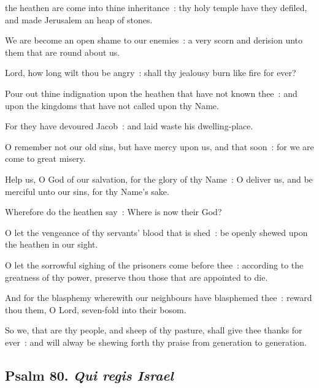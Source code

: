  the heathen are come into thine inheritance~: thy holy temple have they defiled, and made Jerusalem an heap of stones.\par
{}
We are become an open shame to our enemies~: a very scorn and derision unto them that are round about us.\par
{}Lord, how long wilt thou be angry~: shall thy jealousy burn like fire for ever?\par
{}Pour out thine indignation upon the heathen that have not known thee~: and upon the kingdoms that have not called upon thy Name.\par
{}For they have devoured Jacob~: and laid waste his dwelling-place.\par
{}O remember not our old sins, but have mercy upon us, and that soon~: for we are come to great misery.\par
{}Help us, O God of our salvation, for the glory of thy Name~: O deliver us, and be merciful unto our sins, for thy Name's sake.\par
{}Wherefore do the heathen say~: Where is now their God?\par
{}O let the vengeance of thy servants' blood that is shed~: be openly shewed upon the heathen in our sight.\par
{}O let the sorrowful sighing of the prisoners come before thee~: according to the greatness of thy power, preserve thou those that are appointed to die.\par
{}And for the blasphemy wherewith our neighbours have blasphemed thee~: reward thou them, O Lord, seven-fold into their bosom.\par
{}So we, that are thy people, and sheep of thy pasture, shall give thee thanks for ever~: and will alway be shewing forth thy praise from generation to generation.\par

\subsection{Psalm 80. \textit{Qui regis Israel}}


